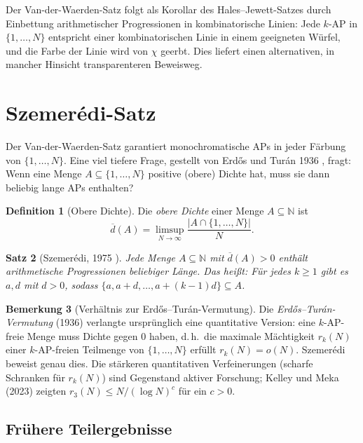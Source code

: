 \documentclass[12pt,a4paper]{amsart}
\newtheorem{theorem}{Satz}[section]
\theoremstyle{definition}
\newtheorem{definition}[theorem]{Definition}
\newtheorem{remark}[theorem]{Bemerkung}
\newcommand{\N}{\mathbb{N}}
\begin{document}
Der Van-der-Waerden-Satz folgt als Korollar des Hales--Jewett-Satzes durch Einbettung
arithmetischer Progressionen in kombinatorische Linien: Jede $k$-AP in
$\{1, \ldots, N\}$ entspricht einer kombinatorischen Linie in einem geeigneten Würfel,
und die Farbe der Linie wird von $\chi$ geerbt. Dies liefert einen alternativen,
in mancher Hinsicht transparenteren Beweisweg.

\section{Szemerédi-Satz}\label{sec:szemeredi}

Der Van-der-Waerden-Satz garantiert monochromatische APs in jeder Färbung von
$\{1,\ldots,N\}$. Eine viel tiefere Frage, gestellt von Erdős und Turán 1936
\cite{ErdosTuran1936}, fragt: Wenn eine Menge $A \subseteq \{1,\ldots,N\}$ positive
(obere) Dichte hat, muss sie dann beliebig lange APs enthalten?

\begin{definition}[Obere Dichte]
Die \emph{obere Dichte} einer Menge $A \subseteq \N$ ist
\[
  \overline{d}(A) = \limsup_{N \to \infty} \frac{|A \cap \{1,\ldots,N\}|}{N}.
\]
\end{definition}

\begin{theorem}[Szemerédi, 1975 \cite{Szemeredi1975}]\label{satz:szemeredi}
Jede Menge $A \subseteq \N$ mit $\overline{d}(A) > 0$ enthält arithmetische
Progressionen beliebiger Länge. Das heißt: Für jedes $k \geq 1$ gibt es $a, d$ mit
$d > 0$, sodass $\{a, a+d, \ldots, a+(k-1)d\} \subseteq A$.
\end{theorem}

\begin{remark}[Verhältnis zur Erdős--Turán-Vermutung]
Die \emph{Erdős--Turán-Vermutung} (1936) verlangte ursprünglich eine quantitative Version:
eine $k$-AP-freie Menge muss Dichte gegen $0$ haben, d.\,h.\ die maximale Mächtigkeit
$r_k(N)$ einer $k$-AP-freien Teilmenge von $\{1,\ldots,N\}$ erfüllt $r_k(N) = o(N)$.
Szemerédi beweist genau dies. Die stärkeren quantitativen Verfeinerungen (scharfe Schranken
für $r_k(N)$) sind Gegenstand aktiver Forschung; Kelley und Meka (2023) zeigten
$r_3(N) \leq N / (\log N)^{c}$ für ein $c > 0$.
\end{remark}

\subsection{Frühere Teilergebnisse}
\end{document}

